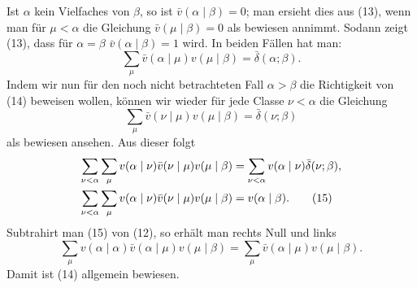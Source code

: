 Ist $\alpha$ kein Vielfaches von $\beta$, so ist $\bar v(\alpha\mid\beta)=0$; man ersieht dies aus (13), wenn man für $\mu<\alpha$ die Gleichung $\bar v(\mu\mid\beta)=0$ als bewiesen annimmt. Sodann zeigt (13), dass für $\alpha=\beta$ $\bar v(\alpha\mid\beta)=1$ wird. In beiden Fällen hat man:
\begin{equation}
 \sum_\mu\bar v(\alpha\mid\mu)v(\mu\mid\beta)=\bar\delta(\alpha;\beta).
\tag{14}
\end{equation}
Indem wir nun für den noch nicht betrachteten Fall $\alpha>\beta$ die Richtigkeit von (14) beweisen wollen, können wir wieder für jede Classe $\nu<\alpha$ die Gleichung
\[
 \sum_\mu\bar v(\nu\mid\mu)v(\mu\mid\beta)=\bar\delta(\nu;\beta)
\]
als bewiesen ansehen. Aus dieser folgt
\begin{align}
\sum_{\nu<\alpha}\sum_\mu v(\alpha\mid\nu)\bar v(\nu\mid\mu)v(\mu\mid\beta)
 &=\sum_{\nu<\alpha}v(\alpha\mid\nu)\bar\delta(\nu;\beta),\notag\\
\sum_{\nu<\alpha}\sum_\mu v(\alpha\mid\nu)\bar v(\nu\mid\mu)v(\mu\mid\beta)&=v(\alpha\mid\beta).
\tag{15}
\end{align}
Subtrahirt man (15) von (12), so erhält man rechts Null und links
\[
 \sum_\mu v(\alpha\mid\alpha)\bar v(\alpha\mid\mu)v(\mu\mid\beta)
 =\sum_\mu\bar v(\alpha\mid\mu)v(\mu\mid\beta).
\]
Damit ist (14) allgemein bewiesen.


